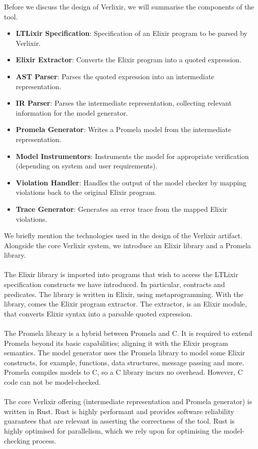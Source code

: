 Before we discuss the design of Verlixir, we will summarise the components of the tool.
\begin{itemize}
    \item \textbf{LTLixir Specification}: Specification of an Elixir program to be parsed by Verlixir.
    \item \textbf{Elixir Extractor}: Converts the Elixir program into a quoted expression.
    \item \textbf{AST Parser}: Parses the quoted expression into an intermediate representation.
    \item \textbf{IR Parser}: Parses the intermediate representation, collecting relevant information for the model generator.
    \item \textbf{Promela Generator}: Writes a Promela model from the intermediate representation.
    \item \textbf{Model Instrumentors}: Instruments the model for appropriate verification (depending on system and user requirements).
    \item \textbf{Violation Handler}: Handles the output of the model checker by mapping violations back to the original Elixir program.
    \item \textbf{Trace Generator}: Generates an error trace from the mapped Elixir violations.
\end{itemize}
We briefly mention the technologies used in the design of the Verlixir artifact. Alongside the core Verlixir system, we introduce an Elixir library and a Promela library. 
\\ \\
The Elixir library is imported into programs that wish to access the LTLixir specification constructs we have introduced. In particular, contracts and predicates. The library is written in Elixir, using metaprogramming. With the library, comes the Elixir program extractor. The extractor, is an Elixir module, that converts Elixir syntax into a parsable quoted expression.
\\ \\
The Promela library is a hybrid between Promela and C. It is required to extend Promela beyond its basic capabilities; aligning it with the Elixir program semantics. The model generator uses the Promela library to model some Elixir constructs, for example, functions, data structures, message passing and more. Promela compiles models to C, so a C library incurs no overhead. However, C code can not be model-checked.
\\ \\
The core Verlixir offering (intermediate representation and Promela generator) is written in Rust. Rust is highly performant and provides software reliability guarantees that are relevant in asserting the correctness of the tool. Rust is highly optimised for parallelism, which we rely upon for optimising the model-checking process.
